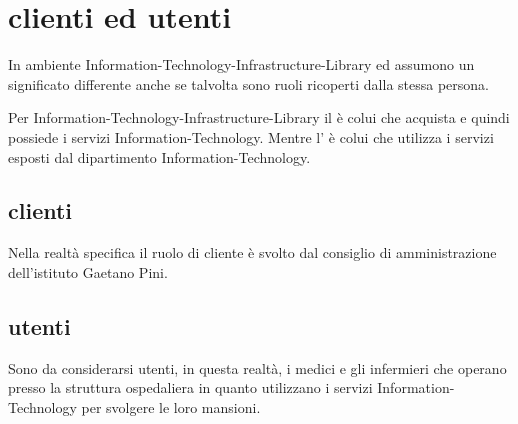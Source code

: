 %
%
\section[Clienti ed utenti]{clienti ed utenti}
\label{sd-client-users}
In ambiente \ac{Information-Technology-Infrastructure-Library}  ed  assumono un significato differente anche se talvolta sono ruoli ricoperti dalla stessa persona.

Per \ac{Information-Technology-Infrastructure-Library} il  è colui che acquista e quindi possiede i servizi \acs{Information-Technology}. Mentre l' è colui che utilizza i servizi esposti dal dipartimento \acs{Information-Technology}.

\subsection[Clienti]{clienti}
\label{sd-clients}
Nella realtà specifica il ruolo di cliente è svolto dal consiglio di amministrazione dell'istituto Gaetano Pini.

\subsection[Utenti]{utenti}
\label{sd-users}
Sono da considerarsi utenti, in questa realtà, i medici e gli infermieri che operano presso la struttura ospedaliera in quanto utilizzano i servizi \acs{Information-Technology} per svolgere le loro mansioni.